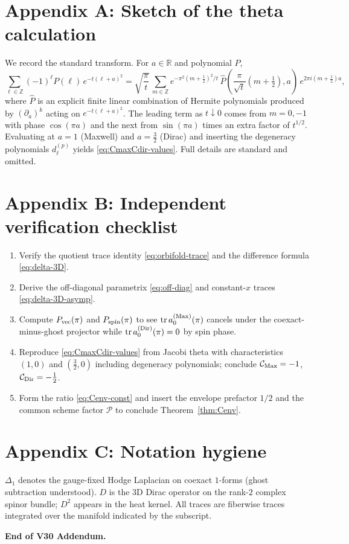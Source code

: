 \documentclass[11pt]{article}
\theoremstyle{definition}
\theoremstyle{remark}
\DeclareMathOperator{\tr}{tr}
\begin{document}
\section*{Appendix A: Sketch of the theta calculation}
We record the standard transform. For $a\in\mathbb{R}$ and polynomial $P$,
\[
\sum_{\ell\in\mathbb{Z}}(-1)^\ell P(\ell)\,e^{-t(\ell+a)^2}
=\sqrt{\frac{\pi}{t}}\,\sum_{m\in\mathbb{Z}}e^{-\pi^2 (m+\tfrac12)^2/t}\,\widehat{P}\!\left(\frac{\pi}{\sqrt{t}}(m+\tfrac12),a\right)\,e^{2\pi i (m+\tfrac12)a},
\]
where $\widehat{P}$ is an explicit finite linear combination of Hermite polynomials produced by $(\partial_a)^k$ acting on $e^{-t(\ell+a)^2}$. The leading term as $t\downarrow 0$ comes from $m=0,-1$ with phase $\cos(\pi a)$ and the next from $\sin(\pi a)$ times an extra factor of $t^{1/2}$. Evaluating at $a=1$ (Maxwell) and $a=\tfrac{3}{2}$ (Dirac) and inserting the degeneracy polynomials $d^{(p)}_\ell$ yields \eqref{eq:CmaxCdir-values}. Full details are standard and omitted.

\section*{Appendix B: Independent verification checklist}
\begin{enumerate}[label=(\roman*)]
\item Verify the quotient trace identity \eqref{eq:orbifold-trace} and the difference formula \eqref{eq:delta-3D}.
\item Derive the off-diagonal parametrix \eqref{eq:off-diag} and constant-$x$ traces \eqref{eq:delta-3D-asymp}.
\item Compute $P_{\rm vec}(\pi)$ and $P_{\rm spin}(\pi)$ to see $\tr a_0^{\rm(Max)}(\pi)$ cancels under the coexact-minus-ghost projector while $\tr a_0^{\rm(Dir)}(\pi)=0$ by spin phase.
\item Reproduce \eqref{eq:CmaxCdir-values} from Jacobi theta with characteristics $(1,0)$ and $(\tfrac{3}{2},0)$ including degeneracy polynomials; conclude $\mathcal{C}_{\rm Max}=-1$, $\mathcal{C}_{\rm Dir}=-\tfrac{1}{2}$.
\item Form the ratio \eqref{eq:Cenv-const} and insert the envelope prefactor $1/2$ and the common scheme factor $\mathscr{P}$ to conclude Theorem~\ref{thm:Cenv}.
\end{enumerate}

\section*{Appendix C: Notation hygiene}
$\Delta_1$ denotes the gauge-fixed Hodge Laplacian on coexact $1$-forms (ghost subtraction understood). $D$ is the $3$D Dirac operator on the rank-$2$ complex spinor bundle; $D^2$ appears in the heat kernel. All traces are fiberwise traces integrated over the manifold indicated by the subscript.
\vspace{6pt}

\noindent\textbf{End of V30 Addendum.}
\end{document}
